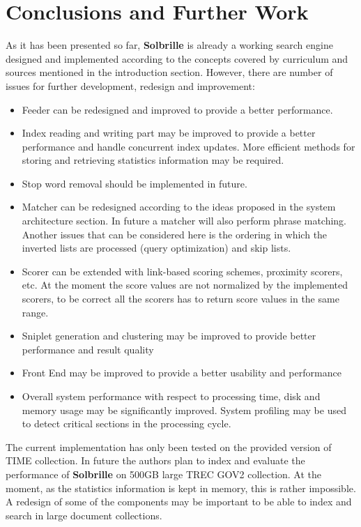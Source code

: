 \chapter{Conclusions and Further Work}
\label{sec:conclusions}
\thispagestyle{fancy}

As it has been presented so far, {\bf Solbrille} is already a working search engine designed and implemented according to the concepts covered by curriculum and sources mentioned in the introduction section. However, there are number of issues for further development, redesign and improvement:

\begin{itemize}
	\item Feeder can be redesigned and improved to provide a better performance.
	\item Index reading and writing part may be improved to provide a better performance and handle concurrent index updates. More efficient methods for storing and retrieving statistics information may be required.
	\item Stop word removal should be implemented in future. 
	\item Matcher can be redesigned according to the ideas proposed in the system architecture section. In future a matcher will also perform phrase matching. Another issues that can be considered here is the ordering in which the inverted lists are processed (query optimization) and skip lists.
	\item Scorer can be extended with link-based scoring schemes, proximity scorers, etc. At the moment the score values are not normalized by the implemented scorers, to be correct all the scorers has to return score values in the same range.
	\item Sniplet generation and clustering may be improved to provide better performance and result quality
	\item Front End may be improved to provide a better usability and performance
	\item Overall system performance with respect to processing time, disk and memory usage may be significantly improved. System profiling may be used to detect critical sections in the processing cycle.  
\end{itemize} 

The current implementation has only been tested on the provided version of TIME collection. In future the authors plan to index and evaluate the performance of {\bf Solbrille} on 500GB large TREC GOV2 collection. At the moment, as the statistics information is kept in memory, this is rather impossible. A redesign of some of the components may be important to be able to index and search in large document collections.

